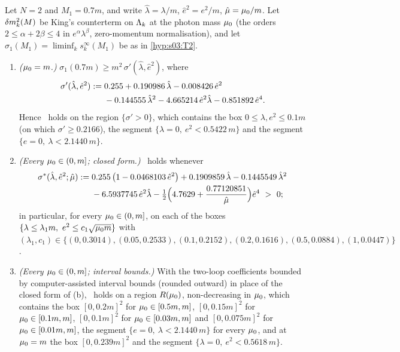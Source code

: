 \begin{proposition}\label{prop:s14:T3}
Let $N=2$ and $M_1=0.7m$, and write $\hat\lambda=\lambda/m$, $\hat e^2=e^2/m$, $\hat\mu=\mu_0/m$. Let $\delta m^2_k(M)$ be King's counterterm \cite[(3.32)--(3.33)]{K1} on $\Lambda_k$ at the photon mass $\mu_0$ (the orders $2\le\alpha+2\beta\le4$ in $e^\alpha\lambda^\beta$, zero-momentum normalisation), and let $\sigma_1(M_1)=\liminf_ks^\infty_k(M_1)$ be as in \cref{hyp:s03:T2}.
\begin{enumerate}[label=\textup{(\alph*)},leftmargin=*]
\item \emph{($\mu_0=m$.)} $\sigma_1(0.7m)\ge m^2\,\sigma'(\hat\lambda,\hat e^2)$, where
\begin{equation}\label{eq:s14:sigmaprime}
\begin{split}
\sigma'(\hat\lambda,\hat e^2):={}&0.255+0.190986\,\hat\lambda-0.008426\,\hat e^2\\
&-0.144555\,\hat\lambda^2-4.665214\,\hat e^2\hat\lambda-0.851892\,\hat e^4 .
\end{split}
\end{equation}
Hence \Tthree\ holds on the region $\{\sigma'>0\}$, which contains the box $0\le\lambda,e^2\le0.1m$ (on which $\sigma'\ge0.2166$), the segment $\{\lambda=0,\ e^2<0.5422\,m\}$ and the segment $\{e=0,\ \lambda<2.1440\,m\}$.
\item \emph{(Every $\mu_0\in(0,m]$; closed form.)} \Tthree\ holds whenever
\begin{equation}\label{eq:s14:sigmastar}
\begin{split}
\sigma^*(\hat\lambda,\hat e^2;\hat\mu):={}&0.255\,\big(1-0.0468103\,\hat e^2\big)+0.1909859\,\hat\lambda-0.1445549\,\hat\lambda^2\\
&-6.5937745\,\hat e^2\hat\lambda-\tfrac12\Big(4.7629+\frac{0.77120851}{\hat\mu}\Big)\hat e^4\ >\ 0 ;
\end{split}
\end{equation}
in particular, for every $\mu_0\in(0,m]$, on each of the boxes $\{\lambda\le\lambda_1m,\ e^2\le c_1\sqrt{\mu_0 m}\}$ with $(\lambda_1,c_1)\in\{(0,0.3014),(0.05,0.2533),(0.1,0.2152),(0.2,0.1616),(0.5,0.0884),(1,0.0447)\}$.
\item \emph{(Every $\mu_0\in(0,m]$; interval bounds.)} With the two-loop coefficients bounded by computer-assisted interval bounds (rounded outward) in place of the closed form of (b), \Tthree\ holds on a region $R(\mu_0)$, non-decreasing in $\mu_0$, which contains the box $[0,0.2m]^2$ for $\mu_0\in[0.5m,m]$, $[0,0.15m]^2$ for $\mu_0\in[0.1m,m]$, $[0,0.1m]^2$ for $\mu_0\in[0.03m,m]$ and $[0,0.075m]^2$ for $\mu_0\in[0.01m,m]$, the segment $\{e=0,\ \lambda<2.1440\,m\}$ for every $\mu_0$, and at $\mu_0=m$ the box $[0,0.239m]^2$ and the segment $\{\lambda=0,\ e^2<0.5618\,m\}$.

\end{enumerate}
\end{proposition}
